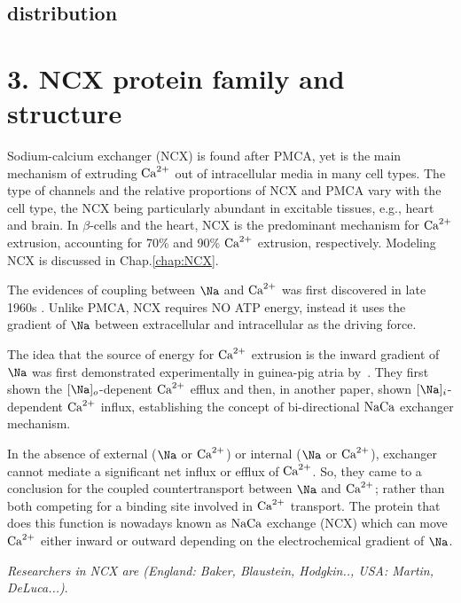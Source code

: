 \subsection{distribution}
\label{sec:NaK-distribution}

\section{3. NCX protein family and structure}
\label{sec:NCX_family}

Sodium-calcium exchanger (NCX) is found after PMCA, yet is the main mechanism of
extruding ${\text{Ca}^{2+}}$ out of intracellular media in many cell types. The type of
channels and the relative proportions of NCX and PMCA vary with the cell type,
the NCX being particularly abundant in excitable tissues, e.g., heart and brain.
In $\beta$-cells and the heart, NCX is the predominant mechanism for ${\text{Ca}^{2+}}$
extrusion, accounting for 70\% and 90\% ${\text{Ca}^{2+}}$ extrusion, respectively.
Modeling NCX is discussed in Chap.\ref{chap:NCX}.

The evidences of coupling between $\Na$ and ${\text{Ca}^{2+}}$ was first discovered in late
1960s \citep{reuter1968, baker1969}. Unlike PMCA, NCX requires NO ATP energy,
instead it uses the gradient of $\Na$ between extracellular and intracellular as
the driving force.

\begin{mdframed}

The idea that the source of energy for ${\text{Ca}^{2+}}$ extrusion is the inward gradient of
$\Na$ was first demonstrated experimentally in guinea-pig atria
by~\citep{reuter1968}. They first shown the $[\Na]_o$-depenent ${\text{Ca}^{2+}}$ efflux and
then, in another paper, shown $[\Na]_i$-dependent ${\text{Ca}^{2+}}$ influx, establishing the
concept of bi-directional ${\text{NaCa}}$ exchanger mechanism\citep{glitsch1970}.

In the absence of external ($\Na$ or ${\text{Ca}^{2+}}$) or internal ($\Na$ or ${\text{Ca}^{2+}}$),
exchanger cannot mediate a significant net influx or efflux of ${\text{Ca}^{2+}}$. So, they
came to a conclusion for the coupled countertransport between $\Na$ and ${\text{Ca}^{2+}}$;
rather than both competing for a binding site involved in ${\text{Ca}^{2+}}$ transport. 
The protein that does this function is nowadays known as ${\text{NaCa}}$ exchange (NCX)
which can move ${\text{Ca}^{2+}}$ either inward or outward depending on the electrochemical
gradient of $\Na$.
\end{mdframed}

{\it Researchers in NCX are (England: Baker, Blaustein,
Hodgkin.., USA: Martin, DeLuca...)}.


